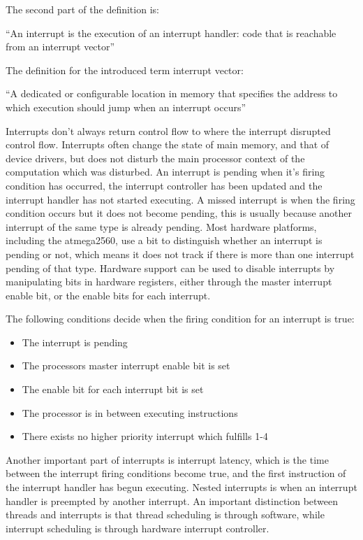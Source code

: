 The second part of the definition is:


{\addtolength{\leftskip}{10 mm}
	\enquote{An interrupt is the execution of an interrupt handler: code that is reachable from an interrupt vector}
	
}


The definition for the introduced term interrupt vector:


{\addtolength{\leftskip}{10 mm}
	\enquote{A dedicated or configurable location in memory that specifies the address to which execution should jump when an interrupt occurs}
	
}


Interrupts don’t always return control flow to where the interrupt disrupted control flow. Interrupts often change the state of main memory, and that of device drivers, but does not disturb the main processor context of the computation which was disturbed. \newline
An interrupt is pending when it's firing condition has occurred, the interrupt controller has been updated and the interrupt handler has not started executing. A missed interrupt is when the firing condition occurs but it does not become pending, this is usually because another interrupt of the same type is already pending. Most hardware platforms, including the atmega2560, use a bit to distinguish whether an interrupt is pending or not, which means it does not track if there is more than one interrupt pending of that type. Hardware support can be used to disable interrupts by manipulating bits in hardware registers, either through the master interrupt enable bit, or the enable bits for each interrupt. 


The following conditions decide when the firing condition for an interrupt is true:


\begin{itemize}
	\item The interrupt is pending
	\item The processors master interrupt enable bit is set
	\item The enable bit for each interrupt bit is set
	\item The processor is in between executing instructions 
	\item There exists no higher priority interrupt which fulfills 1-4
\end{itemize}


Another important part of interrupts is interrupt latency, which is the time between the interrupt firing conditions become true, and the first instruction of the interrupt handler has begun executing. Nested interrupts is when an interrupt handler is preempted by another interrupt. An important distinction between threads and interrupts is that thread scheduling is through software, while interrupt scheduling is through hardware interrupt controller.


